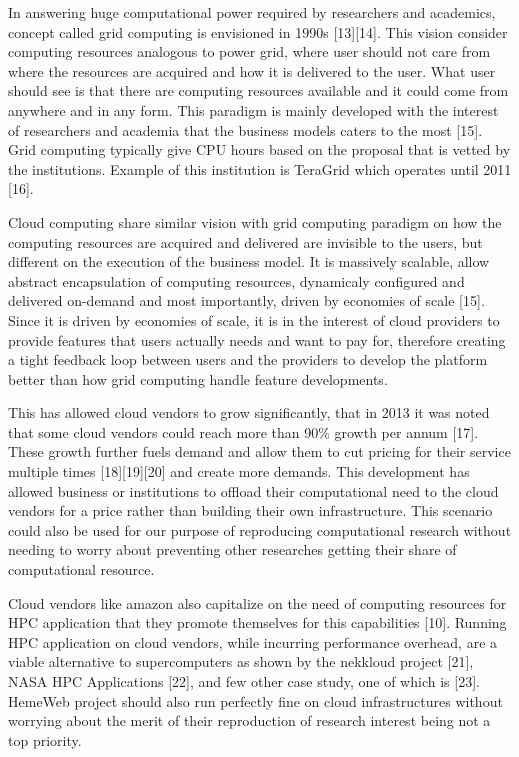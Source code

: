 \documentclass[]{article}
\begin{document}
In answering huge computational power required by researchers and
academics, concept called grid computing is envisioned in 1990s
{[}13{]}{[}14{]}. This vision consider computing resources analogous to
power grid, where user should not care from where the resources are
acquired and how it is delivered to the user. What user should see is
that there are computing resources available and it could come from
anywhere and in any form. This paradigm is mainly developed with the
interest of researchers and academia that the business models caters to
the most {[}15{]}. Grid computing typically give CPU hours based on the
proposal that is vetted by the institutions. Example of this institution
is TeraGrid which operates until 2011 {[}16{]}.

Cloud computing share similar vision with grid computing paradigm on how
the computing resources are acquired and delivered are invisible to the
users, but different on the execution of the business model. It is
massively scalable, allow abstract encapsulation of computing resources,
dynamicaly configured and delivered on-demand and most importantly,
driven by economies of scale {[}15{]}. Since it is driven by economies
of scale, it is in the interest of cloud providers to provide features
that users actually needs and want to pay for, therefore creating a
tight feedback loop between users and the providers to develop the
platform better than how grid computing handle feature developments.

This has allowed cloud vendors to grow significantly, that in 2013 it
was noted that some cloud vendors could reach more than 90\% growth per
annum {[}17{]}. These growth further fuels demand and allow them to cut
pricing for their service multiple times {[}18{]}{[}19{]}{[}20{]} and
create more demands. This development has allowed business or
institutions to offload their computational need to the cloud vendors
for a price rather than building their own infrastructure. This scenario
could also be used for our purpose of reproducing computational research
without needing to worry about preventing other researches getting their
share of computational resource.

Cloud vendors like amazon also capitalize on the need of computing
resources for HPC application that they promote themselves for this
capabilities {[}10{]}. Running HPC application on cloud vendors, while
incurring performance overhead, are a viable alternative to
supercomputers as shown by the nekkloud project {[}21{]}, NASA HPC
Applications {[}22{]}, and few other case study, one of which is
{[}23{]}. HemeWeb project should also run perfectly fine on cloud
infrastructures without worrying about the merit of their reproduction
of research interest being not a top priority.
\end{document}
